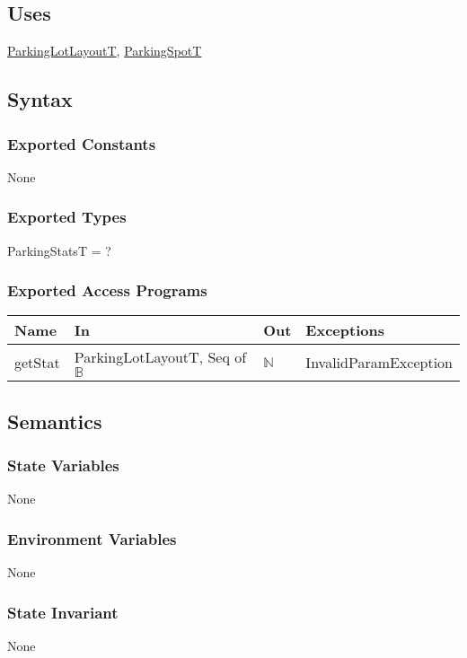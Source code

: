 \documentclass[12pt, titlepage]{article}
\begin{document}
\subsection{Uses}
\hyperref[parkingLotLayout:Module]{ParkingLotLayoutT},
\hyperref[parkingSpot:Module]{ParkingSpotT}

\subsection{Syntax}

\subsubsection{Exported Constants}
None

\subsubsection{Exported Types}
ParkingStatsT = ?

\subsubsection{Exported Access Programs}

\begin{tabular}{l l l l}
\hline
\textbf{Name} & \textbf{In} & \textbf{Out} & \textbf{Exceptions} \\
\hline
getStat & ParkingLotLayoutT, Seq of $\mathbb{B}$ & $\mathbb{N}$ &
InvalidParamException\\
\hline
\end{tabular}

\subsection{Semantics}

\subsubsection{State Variables}
None

\subsubsection{Environment Variables}
None

\subsubsection{State Invariant}
None
\end{document}
